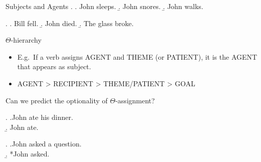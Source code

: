 \documentclass[ignorenonframetext,10pt,aspectratio=169]{beamer}
\begin{document}
\begin{frame}[t,plain]{Subjects and Agents}
\ex.
\a. John sleeps.
\b. John snores.
\b. John walks.

\ex. \a. Bill fell.
\b. John died.
\b. The glass broke.

\end{frame}

\begin{frame}[t,plain]{$\Theta$-hierarchy}

\begin{itemize}
\item E.g.\ If a verb assigns AGENT and THEME (or PATIENT), it is the AGENT that appears as subject.
\pause
\item AGENT > RECIPIENT > THEME/PATIENT > GOAL
\end{itemize}


\end{frame}

\begin{frame}[t,plain]{Can we predict the optionality of $\Theta$-assignment?}

\ex. \a.John ate his dinner.\\ \b. John ate.

\ex. \a.John asked a question.\\ \b. *John asked.

\end{frame}

\begin{frame}[t,plain]{}

\end{frame}
\end{document}
